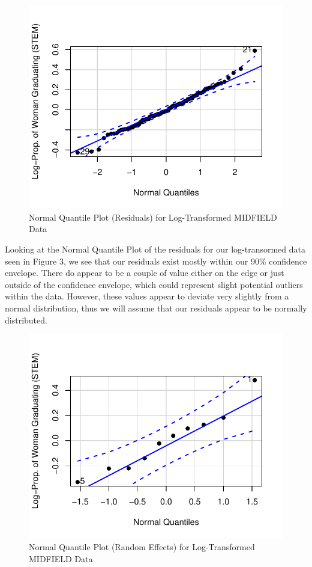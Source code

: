 \documentclass[]{article}
\begin{document}
\begin{figure}
\centering
\includegraphics{Stat_461_Final_Project_Report_files/figure-latex/logNormality-1.pdf}
\caption{Normal Quantile Plot (Residuals) for Log-Transformed MIDFIELD
Data}
\end{figure}

Looking at the Normal Quantile Plot of the residuals for our
log-transormed data seen in Figure 3, we see that our residuals exist
mostly within our 90\% confidence envelope. There do appear to be a
couple of value either on the edge or just outside of the confidence
envelope, which could represent slight potential outliers within the
data. However, these values appear to deviate very slightly from a
normal distribution, thus we will assume that our residuals appear to be
normally distributed.

\begin{figure}
\centering
\includegraphics{Stat_461_Final_Project_Report_files/figure-latex/logNormalityRE-1.pdf}
\caption{Normal Quantile Plot (Random Effects) for Log-Transformed
MIDFIELD Data}
\end{figure}
\end{document}
